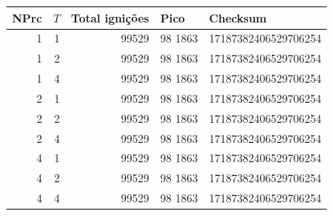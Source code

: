 \begin{tabular}{@{}rrrll@{}}
\toprule
NPrc & $T$ & Total ignições & Pico & Checksum \\
\midrule
1 & 1 & 99529 & 98 1863 & 17187382406529706254 \\
1 & 2 & 99529 & 98 1863 & 17187382406529706254 \\
1 & 4 & 99529 & 98 1863 & 17187382406529706254 \\
2 & 1 & 99529 & 98 1863 & 17187382406529706254 \\
2 & 2 & 99529 & 98 1863 & 17187382406529706254 \\
2 & 4 & 99529 & 98 1863 & 17187382406529706254 \\
4 & 1 & 99529 & 98 1863 & 17187382406529706254 \\
4 & 2 & 99529 & 98 1863 & 17187382406529706254 \\
4 & 4 & 99529 & 98 1863 & 17187382406529706254 \\
\bottomrule
\end{tabular}
